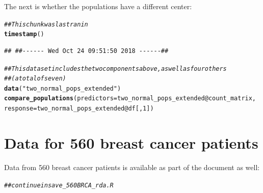 \documentclass{article}\usepackage[]{graphicx}\usepackage[]{color}
\makeatletter
\newcommand{\hlnum}[1]{\textcolor[rgb]{0.686,0.059,0.569}{#1}}%
\newcommand{\hlstr}[1]{\textcolor[rgb]{0.192,0.494,0.8}{#1}}%
\newcommand{\hlcom}[1]{\textcolor[rgb]{0.678,0.584,0.686}{\textit{#1}}}%
\newcommand{\hlopt}[1]{\textcolor[rgb]{0,0,0}{#1}}%
\newcommand{\hlstd}[1]{\textcolor[rgb]{0.345,0.345,0.345}{#1}}%
\newcommand{\hlkwc}[1]{\textcolor[rgb]{0.333,0.667,0.333}{#1}}%
\newcommand{\hlkwd}[1]{\textcolor[rgb]{0.737,0.353,0.396}{\textbf{#1}}}%
\newenvironment{kframe}{%
 \def\at@end@of@kframe{}%
 \ifinner\ifhmode%
  \def\at@end@of@kframe{\end{minipage}}%
  \begin{minipage}{\columnwidth}%
 \fi\fi%
 \def\FrameCommand##1{\hskip\@totalleftmargin \hskip-\fboxsep
 \colorbox{shadecolor}{##1}\hskip-\fboxsep
     \hskip-\linewidth \hskip-\@totalleftmargin \hskip\columnwidth}%
 \MakeFramed {\advance\hsize-\width
   \@totalleftmargin\z@ \linewidth\hsize
   \@setminipage}}%
 {\par\unskip\endMakeFramed%
 \at@end@of@kframe}
\newenvironment{knitrout}{}{} %
\makeatother
\begin{document}
The next is whether the populations have a different center:

\begin{knitrout}
\color{fgcolor}\begin{kframe}
\begin{alltt}
\hlcom{## This chunk was last ran in}
\hlkwd{timestamp}\hlstd{()}
\end{alltt}
\begin{verbatim}
## ##------ Wed Oct 24 09:51:50 2018 ------##
\end{verbatim}
\begin{alltt}
\hlcom{## This dataset includes the two components above, as well as four others}
\hlcom{## (a total of seven)}
\hlkwd{data}\hlstd{(}\hlstr{"two_normal_pops_extended"}\hlstd{)}
\hlkwd{compare_populations}\hlstd{(}\hlkwc{predictors} \hlstd{= two_normal_pops_extended}\hlopt{@}\hlkwc{count_matrix}\hlstd{,}
                    \hlkwc{response} \hlstd{= two_normal_pops_extended}\hlopt{@}\hlkwc{df}\hlstd{[,}\hlnum{1}\hlstd{])}
\end{alltt}


{\ttfamily\noindent\itshape\color{messagecolor}{\#\# Loading required package: Compositional}}

{\ttfamily\noindent\itshape\color{messagecolor}{\#\# \\\#\# Attaching package: 'Compositional'}}

{\ttfamily\noindent\itshape\color{messagecolor}{\#\# The following object is masked from 'package:compositions':\\\#\# \\\#\#\ \ \ \  alr}}

{\ttfamily\noindent\bfseries\color{errorcolor}{\#\# Error in Compositional::comp.test(x = predictors[, -1], ina = tmp\_response, : object 'result' not found}}\end{kframe}
\end{knitrout}


\section{Data for 560 breast cancer patients}
Data from 560 breast cancer patients is available as part of the document as well:

\begin{knitrout}
\color{fgcolor}\begin{kframe}
\begin{alltt}
\hlcom{##continue in save_560BRCA_rda.R}
\end{alltt}
\end{kframe}
\end{knitrout}
\end{document}
